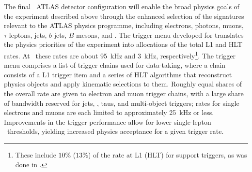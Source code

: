 \documentclass[cernpreprint, atlasdraft=false, UKenglish,british,orcidlogo, texmf, orcidlogo]{atlasdoc}
\begin{document}
The final \RunThr\ ATLAS detector configuration will enable the broad physics goals of the experiment described above through the enhanced selection of the signatures relevant to the ATLAS physics programme, including electrons, photons, muons, $\tau$-leptons, jets, $b$-jets, $B$ mesons, and \MET. The trigger menu developed for \RunThr translates the physics priorities of the experiment into allocations of the total \gls{L1} and \gls{HLT} rates. At \lumirunthree\ these rates are about \SI{95}{\kHz} and \SI{3}{\kHz}, respectively\footnote{These include $10\%$ ($13\%$) of the rate at \gls{L1} (\gls{HLT}) for support triggers, as was done in \RunTwo.}. The trigger menu comprises a list of trigger chains used for data-taking, where a chain consists of a \gls{L1} trigger item and a series of \gls{HLT} algorithms that reconstruct physics objects and apply kinematic selections to them. Roughly equal shares of the overall rate are given to electron and muon trigger chains, with a large share of bandwidth reserved for jets, \MET, taus, and multi-object triggers; rates for single electrons and muons are each limited to approximately \SI{25}{\kHz} or less. Improvements in the trigger performance allow  for lower single-lepton  \pT\ thresholds, yielding increased physics acceptance for a given trigger rate.
 
\end{document}
